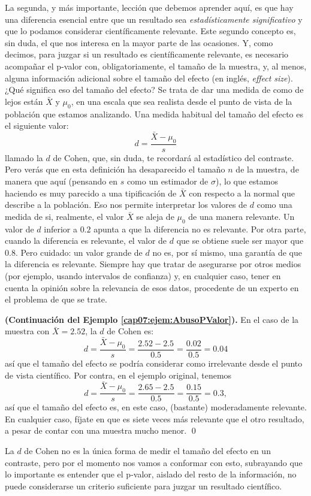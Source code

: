 La segunda, y más importante, lección que debemos aprender aquí, es que hay una diferencia esencial entre que un resultado sea {\em estadísticamente significativo} y que lo podamos considerar {\sf científicamente relevante}. Este segundo concepto es, sin duda, el que nos interesa en la mayor parte de las ocasiones. Y, como decimos, para juzgar si un resultado es científicamente relevante, es necesario acompañar el p-valor con, obligatoriamente, el tamaño de la muestra, y, al menos, alguna información adicional sobre el {\sf tamaño del efecto} (en inglés, {\em effect size}). ¿Qué significa eso del tamaño del efecto? Se trata de dar una medida de como de lejos están $\bar X$ y $\mu_0$, en una escala que sea realista desde el punto de vista de la población que estamos analizando. Una medida habitual del tamaño del efecto es el siguiente valor:
\begin{equation}\label{cap07:ecu:CohenD}
d =\dfrac{\bar X-\mu_0}{s}
\end{equation}
llamado la {\sf $d$ de Cohen}, que, sin duda, te recordará al estadístico del contraste. Pero verás que en esta definición ha desaparecido el tamaño $n$ de la muestra, de manera que aquí (pensando en $s$ como un estimador de $\sigma$), lo que estamos haciendo es muy parecido a una tipificación de $\bar X$ con respecto a la normal que describe a la población. Eso nos permite interpretar los valores de $d$ como una medida de si, realmente, el valor $\bar X$ se aleja de $\mu_0$ de una manera relevante. Un valor de $d$ inferior a $0.2$ apunta a que la diferencia no es relevante. Por otra parte, cuando la diferencia es relevante, el valor de $d$ que se obtiene suele ser mayor que $0.8$. Pero cuidado: un valor grande de $d$ no es, por sí mismo, una garantía de que la diferencia es relevante. Siempre hay que tratar de asegurarse por otros medios (por ejemplo, usando intervalos de confianza) y, en cualquier caso, tener en cuenta la opinión sobre la relevancia de esos datos, procedente de un experto en el problema de que se trate.
\begin{ejemplo}{\bf (Continuación del Ejemplo \ref{cap07:ejem:AbusoPValor}).}
\label{cap07:ejem:AbusoPValor2}
En el caso de la muestra con $\bar X=2.52$, la $d$ de Cohen es:
\[d=\dfrac{\bar X-\mu_0}{s}=\dfrac{2.52-2.5}{0.5}=\dfrac{0.02}{0.5}=0.04\]
así que el tamaño del efecto se podría considerar como irrelevante desde el punto de vista científico. Por contra, en el ejemplo original, tenemos
\[d=\dfrac{\bar X-\mu_0}{s}=\dfrac{2.65-2.5}{0.5}=\dfrac{0.15}{0.5}=0.3,\]
así que el tamaño del efecto es, en este caso, (bastante) moderadamente relevante. En cualquier caso, fíjate en que es siete veces más relevante que el otro resultado, a pesar de contar con una muestra mucho menor.
\qed
\end{ejemplo}
La $d$ de Cohen no es la única forma de medir el tamaño del efecto en un contraste, pero por el momento nos vamos a conformar con esto, subrayando que lo importante es entender que el p-valor, aislado del resto de la información, no puede considerarse un criterio suficiente para juzgar un resultado científico.

